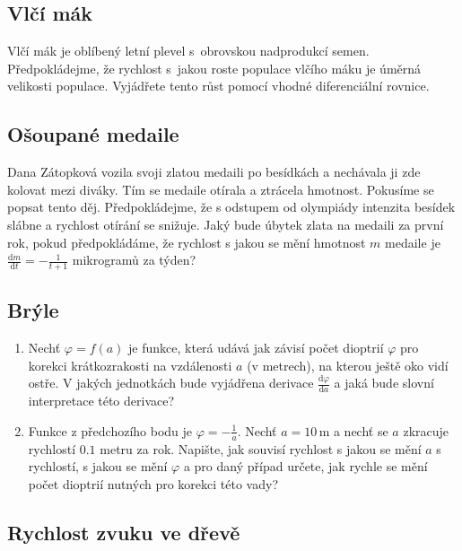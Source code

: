 \subsection{Vlčí mák}
Vlčí mák je oblíbený letní plevel
  s obrovskou nadprodukcí
  semen. Předpokládejme, že rychlost
  s jakou roste populace vlčího máku je
  úměrná velikosti populace. Vyjádřete
  tento růst pomocí vhodné diferenciální
  rovnice.

  \subsection{Ošoupané medaile}

  Dana Zátopková vozila svoji zlatou medaili po besídkách a nechávala ji
    zde kolovat mezi diváky. Tím se medaile otírala a ztrácela hmotnost. Pokusíme
    se popsat tento děj. Předpokládejme, že s odstupem od olympiády intenzita
    besídek slábne a rychlost otírání se snižuje. Jaký bude úbytek zlata na
    medaili za první rok, pokud předpokládáme, že rychlost s jakou se mění
    hmotnost $m$ medaile je $\frac{\mathrm d m}{\mathrm dt}=-\frac{1}{t+1}$
    mikrogramů za týden?

    \subsection{Brýle}

    \begin{enumerate}
 \item Nechť $\varphi=f(a)$ je funkce, která
  udává jak závisí počet dioptrií $\varphi$ pro
  korekci krátkozrakosti na vzdálenosti $a$
  (v metrech), na kterou ještě oko vidí
  ostře. V jakých jednotkách bude
  vyjádřena derivace
  $\frac{\mathrm d\varphi}{\mathrm da}$ a jaká
  bude slovní interpretace této derivace?
\item Funkce z předchozího bodu je
  $\varphi=-\frac 1a$. Nechť $a=10\,\mathrm m$
  a nechť se $a$ zkracuje rychlostí $0.1$
  metru za rok. Napište, jak souvisí rychlost s jakou se mění $a$ s rychlostí, s jakou se mění $\varphi$ a pro daný případ určete, jak rychle se mění počet
  dioptrií nutných pro korekci této vady?

\end{enumerate}



\subsection{Rychlost zvuku ve dřevě}

